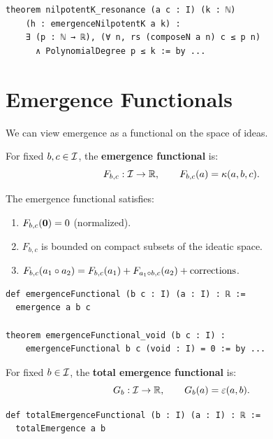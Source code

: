 \begin{lstlisting}[caption={Nilpotent resonance bound (IDT\_v3\_Emergence.lean)}]
theorem nilpotentK_resonance (a c : I) (k : ℕ)
    (h : emergenceNilpotentK a k) :
    ∃ (p : ℕ → ℝ), (∀ n, rs (composeN a n) c ≤ p n)
      ∧ PolynomialDegree p ≤ k := by ...
\end{lstlisting}


\section{Emergence Functionals}

We can view emergence as a functional on the space of ideas.

\begin{definition}
\label{def:emergence-functional}
For fixed $b, c \in \mathcal{I}$, the \textbf{emergence functional} is:
\[
  F_{b,c} : \mathcal{I} \to \mathbb{R}, \qquad F_{b,c}(a) = \kappa(a, b, c).
\]
\end{definition}

\begin{theorem}
\label{thm:emergence-functional-properties}
The emergence functional satisfies:
\begin{enumerate}
  \item $F_{b,c}(\mathbf{0}) = 0$ (normalized).
  \item $F_{b,c}$ is bounded on compact subsets of the ideatic space.
  \item $F_{b,c}(a_1 \circ a_2) = F_{b,c}(a_1) + F_{a_1 \circ b, c}(a_2) + \text{corrections}$.
\end{enumerate}
\end{theorem}

\begin{lstlisting}[caption={Emergence functional (IDT\_v3\_Emergence.lean)}]
def emergenceFunctional (b c : I) (a : I) : ℝ :=
  emergence a b c

theorem emergenceFunctional_void (b c : I) :
    emergenceFunctional b c (void : I) = 0 := by ...
\end{lstlisting}

\begin{definition}
\label{def:total-emergence-functional}
For fixed $b \in \mathcal{I}$, the \textbf{total emergence functional} is:
\[
  G_b : \mathcal{I} \to \mathbb{R}, \qquad G_b(a) = \varepsilon(a, b).
\]
\end{definition}

\begin{lstlisting}[caption={Total emergence functional (IDT\_v3\_Emergence.lean)}]
def totalEmergenceFunctional (b : I) (a : I) : ℝ :=
  totalEmergence a b
\end{lstlisting}


